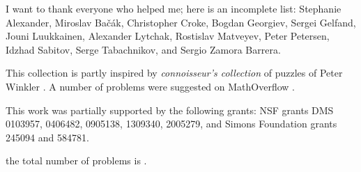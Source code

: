 \documentclass[twoside]{book}
\begin{document}
I want to thank everyone who helped me;
here is an incomplete list:
Stephanie Alexander,
Miroslav Ba\v{c}\'{a}k, 
Christopher Croke,
Bogdan Georgiev,
Sergei Gelfand,
Jouni Luukkainen,
Alexander Lytchak,
Rostislav Matveyev, 
Peter Petersen, 
Idzhad Sabitov,
Serge Tabachnikov, and
Sergio Zamora Barrera.

This collection is partly inspired by \emph{connoisseur's collection} of puzzles of Peter Winkler \cite[][]{winkler}.
A number of problems were suggested on MathOverflow \cite[][]{One-step}.

This work was partially supported by the following grants:
NSF grants DMS 
0103957,
0406482,
0905138,
1309340,
2005279,
and Simons Foundation grants 
245094 and 584781.

\null\vfill{}











%
%

the total number of problems is \thethm.

\backmatter
\newpage
{}
{\scriptsize

}
\sloppy
\printbibliography[heading=bibintoc]
\fussy
\end{document}
